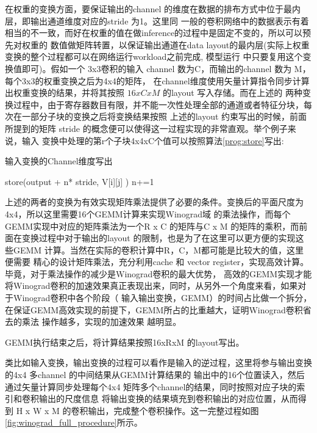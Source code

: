 在权重的变换方面，要保证输出的channel 的维度在数据的排布方式中位于最内层，即输出通道维度对应的stride 为1。这里同
一般的卷积网络中的数据表示有着相当的不一致，而好在权重的值在做inference的过程中是固定不变的，所以可以预先对权重的
数值做矩阵转置，以保证输出通道在data layout的最内层(实际上权重变换的整个过程都可以在网络运行workload之前完成, 模型运行
中只要复用这个变换值即可)。假如一个 3x3卷积的输入 channel 数为C，而输出的channel 数为 M，每个3x3的权重变换之后为4x4的矩阵，
在channel维度使用矢量计算指令同步计算出权重变换的结果，并将其按照 $ 16 x C x M $ 的layout 写入存储。而在上述的
两种变换过程中，由于寄存器数目有限，并不能一次性处理全部的通道或者特征分块，每次在一部分子块的变换之后将变换结果按照
上述的layout 约束写出的时候，前面所提到的矩阵 stride 的概念便可以使得这一过程实现的非常直观。举个例子来说，输入
变换中处理的第r个子块4x4xC个值可以按照算法\ref{prog:store}写出:

\begin{algorithm}
  \caption{输入变换的Channel维度写出}
  \begin{algorithmic}
        \State store(output + n* stride, V[i][j] )
        \State n+=1
      \EndFor
    \EndFor
  \end{algorithmic}
  \label{prog:store}
\end{algorithm}


上述的两者的变换为有效实现矩阵乘法提供了必要的条件。变换后的平面尺度为4x4，所以这里需要16个GEMM计算来实现Winograd域
的乘法操作，而每个GEMM实现中对应的矩阵乘法为一个R x C 的矩阵与C x M 的矩阵的乘积，而前面在变换过程中对于输出的layout
的限制，也是为了在这里可以更方便的实现这些GEMM 计算。当然在实际的卷积计算中R，C，M都可能是比较大的值，这里便需要
精心的设计矩阵乘法，充分利用cache 和 vector register，实现高效计算。毕竟，对于乘法操作的减少是Winograd卷积的最大优势，
高效的GEMM实现才能将Winograd卷积的加速效果真正表现出来，同时，从另外一个角度来看，如果对于Winograd卷积中各个阶段（
输入输出变换，GEMM）的时间占比做一个拆分，在保证GEMM高效实现的前提下，GEMM所占的比重越大，证明Winograd卷积省去的乘法
操作越多，实现的加速效果 越明显。

GEMM执行结束之后，将计算结果按照16xRxM 的layout写出。

类比如输入变换，输出变换的过程可以看作是输入的逆过程，这里将参与输出变换的4x4 多channel 的中间结果从GEMM计算结果的
输出中的16个位置读入，然后通过矢量计算同步处理每个4x4 矩阵多个channel的结果，同时按照对应子块的索引和卷积输出的尺度信息
将输出变换的结果填充到卷积输出的对应位置，从而得到 H x W x M 的卷积输出，完成整个卷积操作。这一完整过程如图\ref{fig:winograd_full_procedure}所示。

